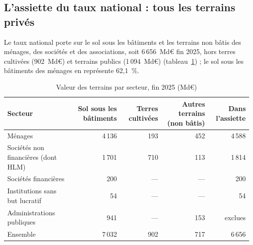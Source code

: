 

\subsection{L'assiette du taux national : tous les terrains privés}

Le taux national porte sur le sol sous les bâtiments et les terrains non bâtis des ménages, des sociétés et des
associations, soit 6\,656~Md€ fin 2025, hors terres cultivées (902~Md€) et terrains publics (1\,094~Md€)
(tableau~\ref{tab:fon_insee}) ; le sol sous les bâtiments des ménages en représente 62,1~\%.

\begin{table}[!htbp]\centering\scriptsize
\caption{Valeur des terrains par secteur, fin 2025 (Md€)}\label{tab:fon_insee}
\begin{tabularx}{\linewidth}{@{}>{\raggedright\arraybackslash}X rrrr@{}}
\toprule
Secteur & Sol sous les bâtiments & Terres cultivées & Autres terrains (non bâtis) & Dans l'assiette \\
\midrule
Ménages & 4\,136 & 193 & 452 & 4\,588 \\
Sociétés non financières (dont HLM) & 1\,701 & 710 & 113 & 1\,814 \\
Sociétés financières & 200 & --- & --- & 200 \\
Institutions sans but lucratif & 54 & --- & --- & 54 \\
Administrations publiques & 941 & --- & 153 & exclues \\
Ensemble & 7\,032 & 902 & 717 & 6\,656 \\
\bottomrule
\end{tabularx}
\par{}
\end{table}

